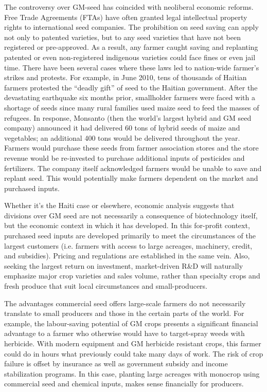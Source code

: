 The controversy over GM-seed has coincided with neoliberal economic reforms. Free Trade Agreements (FTAs) have often granted legal intellectual property rights to international seed companies. The prohibition on seed saving can apply not only to patented varieties, but to any seed varieties that have not been registered or pre-approved. As a result, any farmer caught saving and replanting patented or even non-registered indigenous varieties could face fines or even jail time. There have been several cases where these laws led to nation-wide farmer's strikes and protests. For example, in June 2010, tens of thousands of Haitian farmers protested the ``deadly gift'' of seed to the Haitian government. After the devastating earthquake six months prior, smallholder farmers were faced with a shortage of seeds since many rural families used maize seed to feed the masses of refugees. In response, Monsanto (then the world's largest hybrid and GM seed company) announced it had delivered 60 tons of hybrid seeds of maize and vegetables; an additional 400 tons would be delivered throughout the year. Farmers would purchase these seeds from farmer association stores and the store revenue would be re-invested to purchase additional inputs of pesticides and fertilizers. The company itself acknowledged farmers would be unable to save and replant seed. This would potentially make farmers dependent on the market and purchased inputs.

Whether it's the Haiti case or elsewhere, economic analysis suggests that divisions over GM seed are not necessarily a consequence of biotechnology itself, but the economic context in which it has developed. In this for-profit context, purchased seed inputs are developed primarily to meet the circumstances of the largest customers (i.e. farmers with access to large acreages, machinery, credit, and subsidies). Pricing and regulations are established in the same vein. Also, seeking the largest return on investment, market-driven R\&D will naturally emphasize major crop varieties and sales volume, rather than specialty crops and fresh produce that suit local circumstances and small-producers.

The advantages commercial seed offers large-scale farmers do not necessarily translate to small producers and those in the certain parts of the world. For example, the labour-saving potential of GM crops presents a significant financial advantage to a farmer who otherwise would have to target-spray weeds with herbicide. With modern equipment and GM herbicide resistant crops, this farmer could do in hours what previously could take many days of work. The risk of crop failure is offset by insurance as well as government subsidy and income stabilization programs. In this case, planting large acreages with monocrop using commercial seed and chemical inputs, makes sense financially for producers.	

